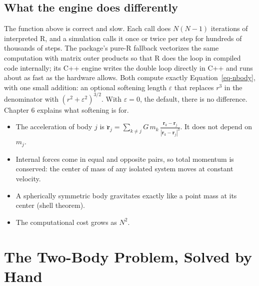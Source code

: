 \documentclass[
  10.5pt,
  letterpaper,
]{scrbook}
\providecommand{\tightlist}{%
  \setlength{\itemsep}{0pt}\setlength{\parskip}{0pt}}
\theoremstyle{plain}
\theoremstyle{remark}
\begin{document}
\section{What the engine does
differently}\label{what-the-engine-does-differently}

The function above is correct and slow. Each call does \(N(N-1)\)
iterations of interpreted R, and a simulation calls it once or twice per
step for hundreds of thousands of steps. The package's pure-R fallback
vectorizes the same computation with matrix outer products so that R
does the loop in compiled code internally; its C++ engine writes the
double loop directly in C++ and runs about as fast as the hardware
allows. Both compute exactly Equation~\ref{eq-nbody}, with one small
addition: an optional softening length \(\varepsilon\) that replaces
\(r^3\) in the denominator with \((r^2 + \varepsilon^2)^{3/2}\). With
\(\varepsilon = 0\), the default, there is no difference. Chapter 6
explains what softening is for.

\begin{tcolorbox}[enhanced jigsaw, arc=.35mm, bottomrule=.15mm, bottomtitle=1mm, breakable, colback=white, colbacktitle=quarto-callout-tip-color!10!white, colframe=quarto-callout-tip-color-frame, coltitle=black, left=2mm, leftrule=.75mm, opacityback=0, opacitybacktitle=0.6, rightrule=.15mm, title={Key results}, titlerule=0mm, toprule=.15mm, toptitle=1mm]

\begin{itemize}
\tightlist
\item
  The acceleration of body \(j\) is
  \(\displaystyle \ddot{\mathbf{r}}_j = \sum_{k \neq j} G\,m_k\,\frac{\mathbf{r}_k - \mathbf{r}_j}{|\mathbf{r}_k - \mathbf{r}_j|^3}\).
  It does not depend on \(m_j\).
\item
  Internal forces come in equal and opposite pairs, so total momentum is
  conserved: the center of mass of any isolated system moves at constant
  velocity.
\item
  A spherically symmetric body gravitates exactly like a point mass at
  its center (shell theorem).
\item
  The computational cost grows as \(N^2\).
\end{itemize}

\end{tcolorbox}

\chapter{The Two-Body Problem, Solved by Hand}\label{sec-two-body}
\end{document}
